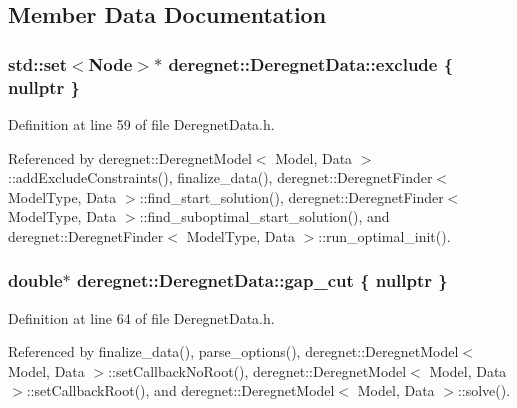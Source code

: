\subsection{Member Data Documentation}
\subsubsection[{\texorpdfstring{exclude}{exclude}}]{\setlength{\rightskip}{0pt plus 5cm}std\+::set$<${\bf Node}$>$$\ast$ deregnet\+::\+Deregnet\+Data\+::exclude \{ nullptr \}}\hypertarget{classderegnet_1_1DeregnetData_a8e4398e6ece11ef87767914c6f2c304d}{}\label{classderegnet_1_1DeregnetData_a8e4398e6ece11ef87767914c6f2c304d}


Definition at line 59 of file Deregnet\+Data.\+h.



Referenced by deregnet\+::\+Deregnet\+Model$<$ Model, Data $>$\+::add\+Exclude\+Constraints(), finalize\+\_\+data(), deregnet\+::\+Deregnet\+Finder$<$ Model\+Type, Data $>$\+::find\+\_\+start\+\_\+solution(), deregnet\+::\+Deregnet\+Finder$<$ Model\+Type, Data $>$\+::find\+\_\+suboptimal\+\_\+start\+\_\+solution(), and deregnet\+::\+Deregnet\+Finder$<$ Model\+Type, Data $>$\+::run\+\_\+optimal\+\_\+init().

\subsubsection[{\texorpdfstring{gap\+\_\+cut}{gap_cut}}]{\setlength{\rightskip}{0pt plus 5cm}double$\ast$ deregnet\+::\+Deregnet\+Data\+::gap\+\_\+cut \{ nullptr \}}\hypertarget{classderegnet_1_1DeregnetData_a3637c87366454adc152487fc2f5cfede}{}\label{classderegnet_1_1DeregnetData_a3637c87366454adc152487fc2f5cfede}


Definition at line 64 of file Deregnet\+Data.\+h.



Referenced by finalize\+\_\+data(), parse\+\_\+options(), deregnet\+::\+Deregnet\+Model$<$ Model, Data $>$\+::set\+Callback\+No\+Root(), deregnet\+::\+Deregnet\+Model$<$ Model, Data $>$\+::set\+Callback\+Root(), and deregnet\+::\+Deregnet\+Model$<$ Model, Data $>$\+::solve().

